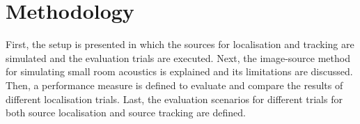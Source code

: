 \section{Methodology}
\label{chap:methodology}

First, the setup is presented in which the sources for localisation and tracking are simulated and the evaluation trials are executed. Next, the image-source method for simulating small room acoustics is explained and its limitations are discussed. Then, a performance measure is defined to evaluate and compare the results of different localisation trials. Last, the evaluation scenarios for different trials for both source localisation and source tracking are defined.
